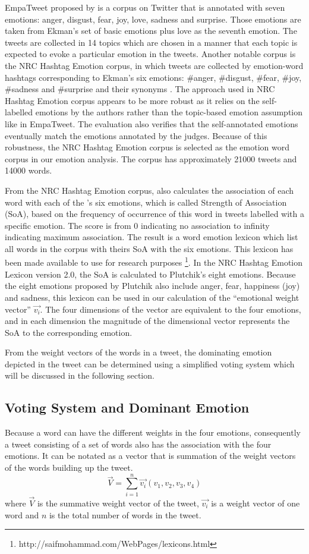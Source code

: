 EmpaTweet proposed by \citet{roberts2012empatweet} is a corpus on Twitter that is annotated with seven emotions: anger, disgust, fear, joy, love, sadness and surprise. Those emotions are taken from Ekman's set of basic emotions plus love as the seventh emotion. The tweets are collected in 14 topics which are chosen in a manner that each topic is expected to evoke a particular emotion in the tweets. Another notable corpus is the NRC Hashtag Emotion corpus, in which tweets are collected by emotion-word hashtags corresponding to Ekman's six emotions: \#anger, \#disgust, \#fear, \#joy, \#sadness and \#surprise and their synonyms \citep{mohammad2012emotional}. The approach used in NRC Hashtag Emotion corpus appears to be more robust as it relies on the self-labelled emotions by the authors rather than the topic-based emotion assumption like in EmpaTweet. The evaluation also verifies that the self-annotated emotions eventually match the emotions annotated by the judges. Because of this robustness, the NRC Hashtag Emotion corpus is selected as the emotion word corpus in our emotion analysis. The corpus has approximately 21000 tweets and 14000 words.

From the NRC Hashtag Emotion corpus, \citet{mohammad2012emotional} also calculates the association of each word with each of the \citet{ekman1971constants}'s six emotions, which is called Strength of Association (SoA), based on the frequency of occurrence of this word in tweets labelled with a specific emotion. The score is from 0 indicating no association to infinity indicating maximum association. The result is a word emotion lexicon which list all words in the corpus with theirs SoA with the six emotions. This lexicon has been made available to use for research purposes \footnote{http://saifmohammad.com/WebPages/lexicons.html}. In the NRC Hashtag Emotion Lexicon version 2.0, the SoA is calculated to Plutchik's eight emotions. Because the eight emotions proposed by Plutchik also include anger, fear, happiness (joy) and sadness, this lexicon can be used in our calculation of the ``emotional weight vector'' \(\vec{v_i}\). The four dimensions of the vector are equivalent to the four emotions, and in each dimension the magnitude of the dimensional vector represents the SoA to the corresponding emotion.

From the weight vectors of the words in a tweet, the dominating emotion depicted in the tweet can be determined using a simplified voting system which will be discussed in the following section.

\subsection{Voting System and Dominant Emotion}
Because a word can have the different weights in the four emotions, consequently a tweet consisting of a set of words also has the association with the four emotions. It can be notated as a vector that is summation of the weight vectors of the words building up the tweet.
\[
	\vec{V} = \sum_{i=1}^{n} \vec{v_i}(v_1, v_2, v_3, v_4)
\]
where \(\vec{V}\) is the summative weight vector of the tweet, \(\vec{v_i}\) is a weight vector of one word and \(n\) is the total number of words in the tweet.

